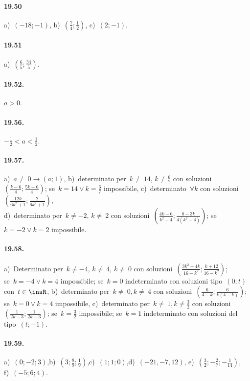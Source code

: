 \paragraph{19.50} a)~$(-18;-1)$, \quad b)~$\left(\frac{7}{4};\frac{1}{2}\right)$, \quad c)~$(2;-1)$.

\paragraph{19.51} a)~$\left(\frac{6}{5};\frac{34}{5}\right)$.

\paragraph{19.52.} $a>0$.

\paragraph{19.56.} $-\frac{1}{2}<a<\frac{1}{2}$.

\paragraph{19.57.} a)~$a\neq~0\rightarrow (a;1)$,
\quad b)~determinato per~$k\neq~14$, $k\neq \frac{6}{7}$ con soluzioni~$\left(\frac{k-6}{4}; \frac{5k-6}{4}\right)$;
se~$k=14\vee k=\frac{6}{7}$ impossibile,
\quad c)~determinato~$\forall k$ con soluzioni~$\left(\frac{12k}{6k^{2}+1};\frac{2}{6k^{2}+1}\right)$,
\protect\\ d)~determinato per~$k\neq -2$, $k\neq~2$ con soluzioni~$\left(\frac{4k-6}{k^{2}-4}; \frac{8-3k}{4(k^{2}-4)}\right)$; se~$k=-2 \vee k=2$ impossibile.

\paragraph{19.58.} a)~Determinato per~$k\neq -4$, $k\neq~4$, $k\neq~0$ con soluzioni~$\left(\frac{3k^{2}+4k}{16-k^{2}}; \frac{k+12}{16-k^{2}}\right)$;\protect\\
se~$k=-4\vee k=4$ impossibile; se~$k=0$ indeterminato con soluzioni tipo~$(0;t)$ con~$t\in\insR$,
\quad b)~determinato per~$k\neq~0, k\neq~4$ con soluzioni~$\left(\frac{6}{4-k}; \frac{6}{k(4-k)}\right)$;
se~$k=0\vee k=4$ impossibile,
\quad c)~determinato per~$k\neq~1, k\neq \frac{3}{2}$ con soluzioni~$\left(\frac{1}{2k-3}; \frac{1}{2k-3}\right)$;
se~$k=\frac{3}{2}$ impossibile; se~$k=1$ indeterminato con soluzioni del tipo~$(t;-1)$.

\paragraph{19.59.} a)~$(0; -2; 3)$,\quad b)~$\left(3;\frac{8}{9};\frac{1}{9}\right)$,\quad c)~$(1; 1;0)$,\quad d)~$(-21, -7, 12)$, \quad e)~$\left(\frac{3}{2};-\frac{2}{7};-\frac{1}{14}\right)$,\protect\\ f)~$(-5; 6; 4)$.

